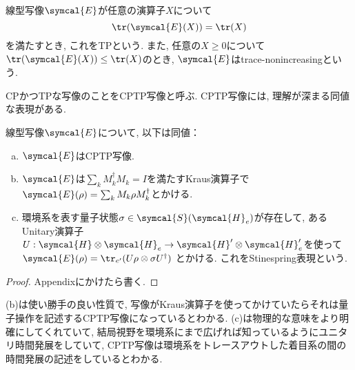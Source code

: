 \begin{mydfn}[TP写像]\label{dfn.TP-map}
  線型写像$\symcal{E}$が任意の演算子$X$について
  \begin{equation}
    \tr(\symcal{E}(X))=\tr(X)
  \end{equation}
  を満たすとき, これをTPという. 
  また, 任意の$X\geq 0$について$\tr(\symcal{E}(X))\leq\tr(X)$のとき, $\symcal{E}$はtrace-nonincreasingという. 
\end{mydfn}

CPかつTPな写像のことをCPTP写像と呼ぶ. 
CPTP写像には, 理解が深まる同値な表現がある. 

\begin{mythm}[CPTP写像の同値な表現]\label{thm.CPTP-map}
  線型写像$\symcal{E}$について, 以下は同値：
  \begin{enumerate}[(a). ]
    \item $\symcal{E}$はCPTP写像. 
    \item $\symcal{E}$は$\sum_{k}M_k^{\dag}M_k=I$を満たすKraus演算子で$\symcal{E}(\rho)=\sum_{k}M_k\rho M_k^{\dag}$とかける. 
    \item 環境系を表す量子状態$\sigma\in\symcal{S}(\symcal{H}_e)$が存在して, あるUnitary演算子$U:\symcal{H}\otimes \symcal{H}_e\to \symcal{H}'\otimes \symcal{H}_e'$を使って
      $\symcal{E}(\rho)=\tr_{e'}(U\rho\otimes\sigma U^{\dag})$
    とかける. 
    これをStinespring表現という. 
  \end{enumerate}
\end{mythm}

\begin{proof}
  Appendixにかけたら書く. 
\end{proof}

(b)は使い勝手の良い性質で, 写像がKraus演算子を使ってかけていたらそれは量子操作を記述するCPTP写像になっているとわかる. 
(c)は物理的な意味をより明確にしてくれていて, 結局視野を環境系にまで広げれば知っているようにユニタリ時間発展をしていて, CPTP写像は環境系をトレースアウトした着目系の間の時間発展の記述をしているとわかる. 